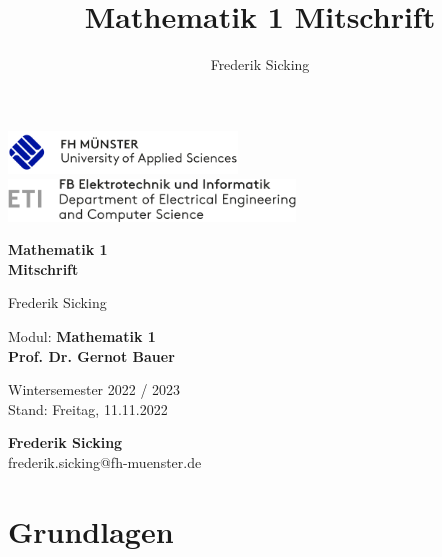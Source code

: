 \documentclass[a4paper,12pt,oneside,openany]{book}
\author{Frederik Sicking}
\title{Mathematik 1 Mitschrift}
\newcommand{\überschrift}[1]{\subsubsection{#1}}
\begin{document}
\begin{titlepage}

	\includegraphics[height=0.45in]{logo}
	\hspace{\fill}
	\includegraphics[height=0.45in]{ETI-logo}

	\vspace*{5cm}
	\fontsize{36}{36}\selectfont \textbf{Mathematik 1}\\
	\fontsize{28}{28}\selectfont \textcolor{fhblue}{\textbf{Mitschrift}}

	\vspace{1.5cm}
	\fontsize{20}{20}\selectfont Frederik Sicking

	\vspace{\fill}
	\begin{flushright}

		\fontsize{12}{15}\selectfont
		Modul: \textbf{Mathematik 1} \\
		\textbf{Prof. Dr. Gernot Bauer}

		\vspace{0.5cm}
		Wintersemester 2022 / 2023 \\
		Stand: Freitag, 11.11.2022

		\vspace{1.5cm}
		\textbf{Frederik Sicking}\\
		\vspace{0.5cm}
		frederik.sicking@fh-muenster.de

	\end{flushright}
\end{titlepage}

\frontmatter
{}


\setcounter{tocdepth}{3}
\setlength{\cftsecindent}{5mm}
\setlength{\cftsubsecindent}{1cm}
\setlength{\cftsubsubsecindent}{1.5cm}
\tableofcontents

\mainmatter
\chapter{Grundlagen}
\setcounter{page}{1}
\end{document}
